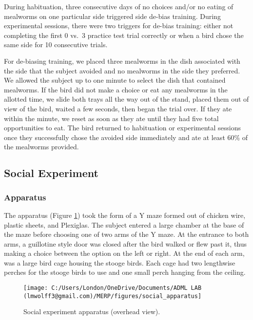 \documentclass[
  english,
  ,doc,floatsintext]{apa6}
\begin{document}
During habituation, three consecutive days of no choices and/or no eating of mealworms on one particular side triggered side de-bias training. During experimental sessions, there were two triggers for de-bias training: either not completing the first 0 vs.~3 practice test trial correctly or when a bird chose the same side for 10 consecutive trials.

For de-biasing training, we placed three mealworms in the dish associated with the side that the subject avoided and no mealworms in the side they preferred. We allowed the subject up to one minute to select the dish that contained mealworms. If the bird did not make a choice or eat any mealworms in the allotted time, we slide both trays all the way out of the stand, placed them out of view of the bird, waited a few seconds, then began the trial over. If they ate within the minute, we reset as soon as they ate until they had five total opportunities to eat. The bird returned to habituation or experimental sessions once they successfully chose the avoided side immediately and ate at least 60\% of the mealworms provided.

\hypertarget{social-experiment}{%
\subsection{Social Experiment}\label{social-experiment}}

\hypertarget{apparatus-1}{%
\subsubsection{Apparatus}\label{apparatus-1}}

The apparatus (Figure \ref{fig:socialapp}) took the form of a Y maze formed out of chicken wire, plastic sheets, and Plexiglas. The subject entered a large chamber at the base of the maze before choosing one of two arms of the Y maze. At the entrance to both arms, a guillotine style door was closed after the bird walked or flew past it, thus making a choice between the option on the left or right. At the end of each arm, was a large bird cage housing the stooge birds. Each cage had two lengthwise perches for the stooge birds to use and one small perch hanging from the ceiling.



\begin{figure}

{\centering \texttt{[image: C:/Users/London/OneDrive/Documents/ADML LAB (lmwolff3@gmail.com)/MERP/figures/social\_apparatus]} 

}

\caption{Social experiment apparatus (overhead view).}\label{fig:socialapp}
\end{figure}
\end{document}
